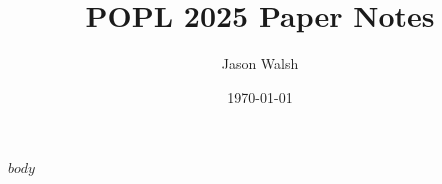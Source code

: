 \documentclass[12pt]{article}
\title{POPL 2025 Paper Notes}
\author{Jason Walsh}
\date{\today}
\begin{document}
\maketitle

$body$
\end{document}
